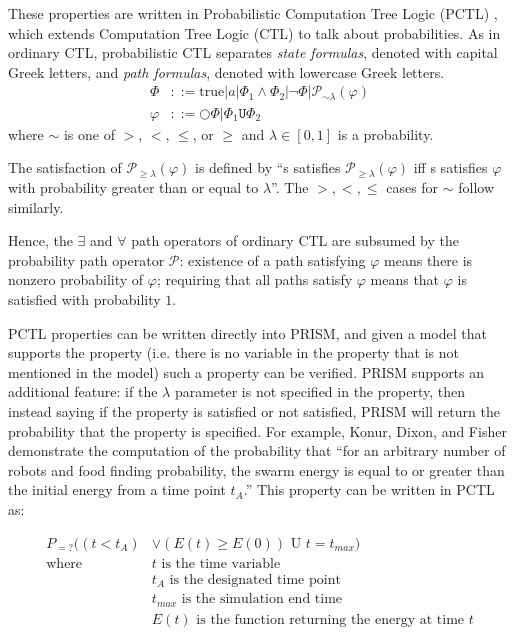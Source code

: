 \documentclass[11pt]{article}
\theoremstyle{definition}
\renewcommand{\phi}{\varphi}
\newcommand{\OR}{\mathbin{\big\vert}}
\renewcommand{\P}[2]{\mathcal{P}_{#1}\left(#2\right)}
\newcommand{\until}{\mathbin{\mathtt{U}}}
\newcommand{\X}{\bigcirc}
\begin{document}
These properties are written in Probabilistic Computation Tree Logic (PCTL)
\cite{pctl}, which extends Computation Tree Logic (CTL) to talk about
probabilities. As in ordinary CTL, probabilistic CTL separates
\emph{state formulas}, denoted with capital Greek letters, and
\emph{path formulas}, denoted with lowercase Greek letters.
%
\begin{align*}
    \Phi &::= \text{true}
        \OR a
        \OR \Phi_1 \land \Phi_2
        \OR \neg \Phi
        \OR \P{\sim \lambda}{\phi} \\
    \phi &::= \X \Phi \OR \Phi_1 \until \Phi_2
\end{align*}
%
where $\sim$ is one of $>$, $<$, $\leq$, or $\geq$ and $\lambda \in [0,1]$ is
a probability.

The satisfaction of $\P{\geq\lambda}{\phi}$ is defined by
``s satisfies $ \mathcal{P}_{\geq\lambda} ( \phi ) $ iff s
satisfies $ \phi $ with probability greater than or equal
to $ \lambda $''.
The $ >, <, \leq $ cases for $ \sim $ follow similarly.

Hence, the $\exists$ and $\forall$ path operators of ordinary CTL are subsumed
by the probability path operator $\mathcal{P}$: existence of a path satisfying
$\phi$ means there is nonzero probability of $\phi$; requiring that all paths
satisfy $\phi$ means that $\phi$ is satisfied with probability $1$.


PCTL properties can be written directly into PRISM, and
given a model that supports the property (i.e. there is
no variable in the property that is not mentioned
in the model) such a property can be verified.
PRISM supports an additional feature: if the $ \lambda $
parameter is not specified in the property, then
instead saying if the property is satisfied or not
satisfied, PRISM will return the probability that
the property is specified. For example, Konur,
Dixon, and Fisher demonstrate the computation of
the probability that ``for an arbitrary number of robots
and food finding probability, the swarm energy is
equal to or greater than the initial energy from
a time point $ t_A $.'' This property can be written
in PCTL as:

\begin{align*}
    P_{=?}((t < t_A) & \vee (E(t) \geq E(0)) \text{ U } t = t_{max} ) \\
    \text{where } & t \text{ is the time variable} \\
                  & t_A \text{ is the designated time point} \\
                  & t_{max} \text{ is the simulation end time} \\
                  & E(t) \text{ is the function returning the energy at time } t
\end{align*}
\end{document}
